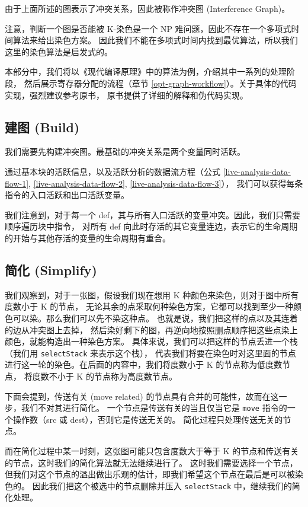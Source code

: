 由于上面所述的图表示了冲突关系，因此被称作冲突图 (Interference Graph)。

注意，判断一个图是否能被 K-染色是一个 NP 难问题，因此不存在一个多项式时间算法来给出染色方案。
因此我们不能在多项式时间内找到最优算法，所以我们这里的染色算法是启发式的。

本部分中，我们将以《现代编译原理》\cite{TigerBook}中的算法为例，介绍其中一系列的处理阶段，
然后展示寄存器分配的流程（章节 \ref{opt-graph-workflow}）。关于具体的代码实现，强烈建议参考原书，
原书提供了详细的解释和伪代码实现。

\subsection{建图 (Build)} \label{opt-graph-build}

我们需要先构建冲突图。最基础的冲突关系是两个变量同时活跃。

通过基本块的活跃信息，以及活跃分析的数据流方程（公式 \ref{live-analysis-data-flow-1},
\ref{live-analysis-data-flow-2}, \ref{live-analysis-data-flow-3}），
我们可以获得每条指令的入口活跃和出口活跃变量。

我们注意到，对于每一个 def，其与所有入口活跃的变量冲突。因此，我们只需要顺序遍历块中指令，
对所有 def 向此时存活的其它变量连边，表示它的生命周期的开始与其他存活的变量的生命周期有重合。

\subsection{简化 (Simplify)} \label{opt-graph-simplify}

我们观察到，对于一张图，假设我们现在想用 K 种颜色来染色，则对于图中所有度数小于 K 的节点，
无论其余的点采取何种染色方案，它都可以找到至少一种颜色可以染。那么我们可以先不染这种点。
也就是说，我们把这样的点以及其连着的边从冲突图上去掉，
然后染好剩下的图，再逆向地按照删点顺序把这些点染上颜色，就能构造出一种染色方案。
具体来说，我们可以把这样的节点丢进一个栈（我们用 \texttt{selectStack} 来表示这个栈），
代表我们将要在染色时对这里面的节点进行这一轮的染色。在后面的内容中，我们将度数小于 K 的节点称为低度数节点，
将度数不小于 K 的节点称为高度数节点。

下面会提到，传送有关 (move related) 的节点具有合并的可能性，故而在这一步，我们不对其进行简化。
一个节点是传送有关的当且仅当它是 \texttt{move} 指令的一个操作数（src 或 dest），否则它是传送无关的。
简化过程只处理传送无关的节点。

而在简化过程中某一时刻，这张图可能只包含度数大于等于 K 的节点和传送有关的节点，这时我们的简化算法就无法继续进行了。
这时我们需要选择一个节点，但我们对这个节点的溢出做出乐观的估计，即我们希望这个节点在最后是可以被染色的。
因此我们把这个被选中的节点删除并压入 \texttt{selectStack} 中，继续我们的简化处理。


